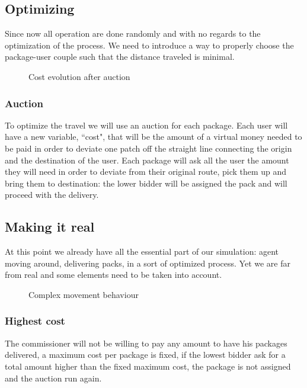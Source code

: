 \documentclass[11pt,a4paper]{article}
\begin{document}
\newpage
\subsection{Optimizing}
Since now all operation are done randomly and with no regards to the optimization of the process. We need to introduce a way to properly choose the package-user couple such that the distance traveled is minimal.

\begin{figure}[h!]
\centering
\caption{Cost evolution after auction}
\end{figure}
\subsubsection*{Auction}
To optimize the travel we will use an auction for each package.
Each user will have a new variable, “cost", that will be the amount of a virtual money needed to be paid in order to deviate one patch off the straight line connecting the origin and the destination of the user.
Each package will ask all the user the amount they will need in order to deviate from their original route, pick them up and bring them to destination: the lower bidder will be assigned the pack and will proceed with the delivery.
\begin{figure}[h!]
\centering
\end{figure}
\newpage
\subsection{Making it real}
At this point we already have all the essential part of our simulation: agent moving around, delivering packs, in a sort of optimized process. Yet we are far from real and some elements need to be taken into account.

\begin{figure}[h!]
\centering
\caption{Complex movement behaviour}
\end{figure}
\medskip
\subsubsection*{Highest cost}
The commissioner will not be willing to pay any amount to have his packages delivered, a maximum cost per package is fixed, if the lowest bidder ask for a total amount higher than the fixed maximum cost, the package is not assigned and the auction run again.
\medskip
\end{document}
